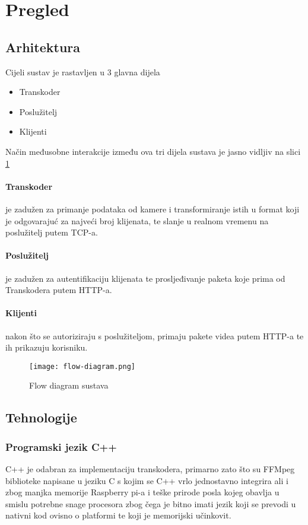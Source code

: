 \section{Pregled}

\subsection{Arhitektura}
Cijeli sustav je rastavljen u 3 glavna dijela
\begin{itemize}
  \item Transkoder
  \item Poslužitelj
  \item Klijenti
\end{itemize}
Način međusobne interakcije između ova tri dijela sustava je jasno vidljiv na slici \ref{pic:flow_diagram}
\paragraph{Transkoder}
je zadužen za primanje podataka od kamere i transformiranje istih u format koji je odgovarajuć za najveći broj klijenata, 
te slanje u realnom vremenu na poslužitelj putem TCP-a.
\paragraph{Poslužitelj}
je zadužen za autentifikaciju klijenata te prosljeđivanje paketa koje prima od Transkodera putem HTTP-a.
\paragraph{Klijenti}
nakon što se autoriziraju s poslužiteljom, primaju pakete videa putem HTTP-a te ih prikazuju korisniku.
\begin{figure}[h]
  \centering
  \texttt{[image: flow-diagram.png]}
  \caption{Flow diagram sustava}
  \label{pic:flow_diagram}
\end{figure}

\clearpage
\subsection{Tehnologije}

\subsubsection{Programski jezik C++}
C++ je odabran za implementaciju transkodera, primarno zato što su FFMpeg biblioteke napisane u jeziku C 
s kojim se C++ vrlo jednostavno integrira ali i zbog manjka memorije Raspberry pi-a i teške prirode posla kojeg obavlja
u smislu potrebne snage procesora zbog čega je bitno imati jezik koji se prevodi u nativni kod ovisno o platformi te koji
je memorijski učinkovit. \cite{bStrou}

